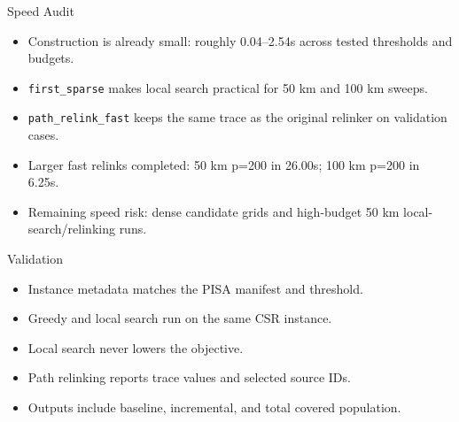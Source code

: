 \documentclass[10pt,aspectratio=169]{beamer}
\newcommand{\code}[1]{\texttt{#1}}
\begin{document}
\begin{frame}{Speed Audit}
  \small
  \begin{itemize}
    \item Construction is already small: roughly 0.04--2.54s across tested thresholds and budgets.
    \item \code{first\_sparse} makes local search practical for 50 km and 100 km sweeps.
    \item \code{path\_relink\_fast} keeps the same trace as the original relinker on validation cases.
    \item Larger fast relinks completed: 50 km p=200 in 26.00s; 100 km p=200 in 6.25s.
    \item Remaining speed risk: dense candidate grids and high-budget 50 km local-search/relinking runs.
  \end{itemize}
\end{frame}

\begin{frame}{Validation}
  \begin{itemize}
    \item Instance metadata matches the PISA manifest and threshold.
    \item Greedy and local search run on the same CSR instance.
    \item Local search never lowers the objective.
    \item Path relinking reports trace values and selected source IDs.
    \item Outputs include baseline, incremental, and total covered population.
  \end{itemize}
\end{frame}
\end{document}
